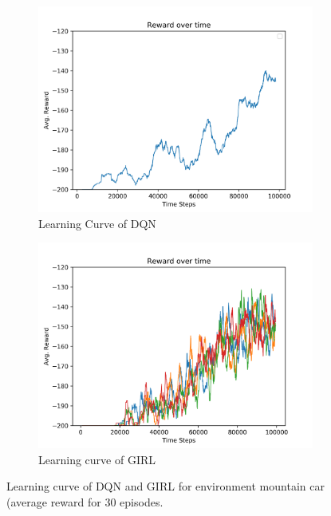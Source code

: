 \documentclass[a4paper]{article}
\begin{document}
\begin{figure}[H]
\centering
\begin{subfigure}{.45\textwidth}
  \includegraphics[width=\linewidth]{figures/dqn-mountain-car.png}
  \caption{Learning Curve of DQN}
  \label{fig:learning-curve-dqn-mountain-car}
\end{subfigure}
\begin{subfigure}{.45\textwidth}
  \includegraphics[width=\linewidth]{figures/grl-mountain-car.png}
  \caption{Learning curve of GIRL}
  \label{fig:learning-curve-girl-mountain-car}
\end{subfigure}
\caption{Learning curve of DQN and GIRL for environment mountain car (average reward for 30 episodes.}
\label{fig:learning-curve-dqn-grl-mountain-car}
\end{figure}
\end{document}
